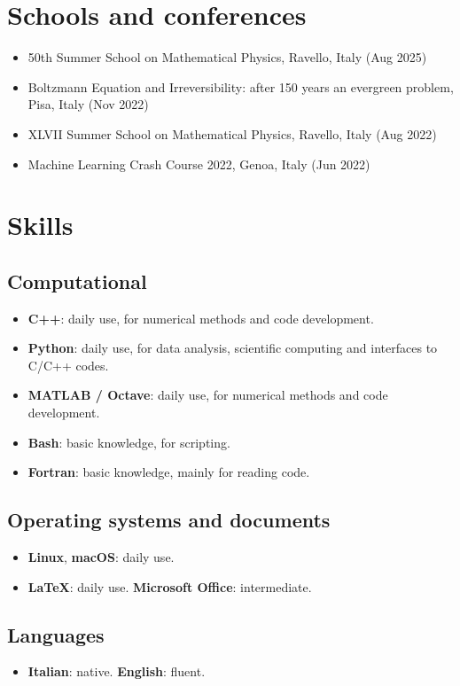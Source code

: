 \documentclass[11pt]{article}
\begin{document}
\section{Schools and conferences}
\begin{itemize}
  \item 50th Summer School on Mathematical Physics, Ravello, Italy (Aug 2025)
  \item Boltzmann Equation and Irreversibility: after 150 years an evergreen problem, Pisa, Italy (Nov 2022)
  \item XLVII Summer School on Mathematical Physics, Ravello, Italy (Aug 2022)
  \item Machine Learning Crash Course 2022, Genoa, Italy (Jun 2022)
\end{itemize}

\section{Skills}
\subsection{Computational}
\begin{itemize}
  \item \textbf{C++}: daily use, for numerical methods and code development.
  \item \textbf{Python}: daily use, for data analysis, scientific computing and interfaces to C/C++ codes.
  \item \textbf{MATLAB / Octave}: daily use, for numerical methods and code development.
  \item \textbf{Bash}: basic knowledge, for scripting.
  \item \textbf{Fortran}: basic knowledge, mainly for reading code.
\end{itemize}
\subsection{Operating systems and documents}
\begin{itemize}
  \item \textbf{Linux}, \textbf{macOS}: daily use.
  \item \textbf{LaTeX}: daily use. \textbf{Microsoft Office}: intermediate.
\end{itemize}
\subsection{Languages}
\begin{itemize}
  \item \textbf{Italian}: native. \textbf{English}: fluent.
\end{itemize}
\end{document}
